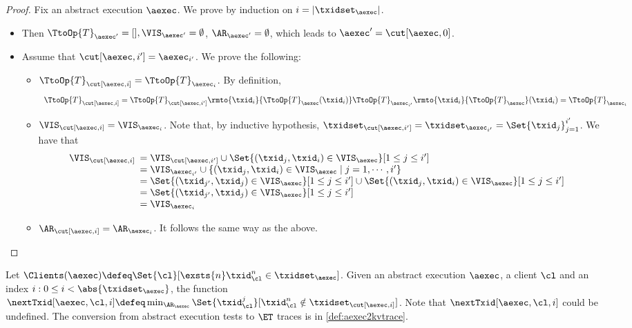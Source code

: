 \begin{proof}
Fix an abstract execution $\aexec$. We prove by induction on $i = \lvert \txidset_{\aexec} \rvert$.
\begin{itemize}
\item {} Then $\TtoOp{T}_{\aexec'} = [], \VIS_{\aexec'} = \emptyset$, 
$\AR_{\aexec'} = \emptyset$, which leads to $\aexec' = \cut[\aexec, 0]$. 
\item {} 
Assume that $\cut[\aexec, i'] = \aexec_{i'}$. 
We prove the following: 
\begin{itemize}
\item $\TtoOp{T}_{\cut[\aexec, i]} = \TtoOp{T}_{\aexec_i}$. 
By definition, 
\[
    \begin{array}{l}
\TtoOp{T}_{\cut[\aexec,i]} = \TtoOp{T}_{\cut[\aexec, i']}\rmto{\txid_{i}}{\TtoOp{T}_{\aexec}(\txid_{i})} 
\TtoOp{T}_{\aexec_{i'}}\rmto{\txid_{i}}{\TtoOp{T}_{\aexec}}(\txid_{i}) = \TtoOp{T}_{\aexec_{i}}
\end{array}
\]
\item $\VIS_{\cut[\aexec, i]} = \VIS_{\aexec_{i}}$. 
Note that, by inductive hypothesis, $\txidset_{\cut[\aexec, i']} = \txidset_{\aexec_{i'}} = \Set{\txid_{j}}_{j=1}^{i'}$. 
We have that  
\[
\begin{array}{l}
    \VIS_{\cut[\aexec, i]}
    \begin{array}[t]{l}
    = \VIS_{\cut[\aexec, i']} \cup \Set{(\txid_j, \txid_{i}) \in \VIS_{\aexec}}[1 \leq j \leq i'] \\ 
    = \VIS_{\aexec_{i'}} \cup \{(\txid_{j}, \txid_{i}) \in \VIS_{\aexec} \mid j=1,\cdots, i'\} \\ 
    = \Set{(\txid_{j'}, \txid_{j}) \in \VIS_{\aexec}}[1 \leq j \leq i'] \cup \Set{(\txid_{j}, \txid_{i}) \in \VIS_{\aexec}}[1 \leq j \leq i'] \\
    = \Set{(\txid_{j'}, \txid_{j}) \in \VIS_{\aexec}}[1 \leq j \leq i'] \\
    = \VIS_{\aexec_{i}}
    \end{array}
\end{array}
\]
\item $\AR_{\cut[\aexec, i]} = \AR_{\aexec_{i}}$. It follows the same way 
as the above. 
\end{itemize}
\end{itemize}
\end{proof}

Let $\Clients(\aexec) \defeq \Set{\cl}[\exsts{ n } \txid_{\cl}^{n} \in \txidset_{\aexec}]$.
Given an abstract execution $\aexec$, a client $\cl$ and an index $i : 0 \leq i < \abs{\txidset_\aexec}$,
the function $\nextTxid[\aexec, \cl, i] \defeq \min_{\AR_{\aexec}} \Set{\txid_{\cl}^{j} }[ \txid_{\cl}^{n} \notin \txidset_{\cut[\aexec, i]}]$. 
Note that $\nextTxid[\aexec, \cl, i]$ could be undefined. 
The conversion from abstract execution tests to \( \ET \) traces is in \cref{def:aexec2kvtrace}.

